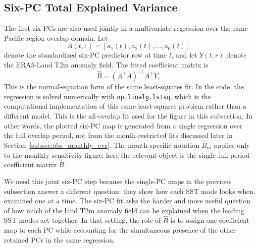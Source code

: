 \documentclass[11pt]{article}
\begin{document}
\subsection{Six-PC Total Explained Variance}
\label{subsec:obs_total_evr}

The first six PCs are also used jointly in a multivariate regression over the same Pacific-region
overlap domain. Let
\begin{equation}
A(t,:) = \left[a_1(t), a_2(t), \dots, a_6(t)\right]
\end{equation}
denote the standardized six-PC predictor row at time $t$, and let $Y(t,r)$ denote the ERA5-Land
T2m anomaly field. The fitted coefficient matrix is
\begin{equation}
\hat{B} = (A^\top A)^{-1} A^\top Y,
\label{eq:bhat_multi}
\end{equation}
This is the normal-equation form of the same least-squares fit. In the code, the regression is
solved numerically with \texttt{np.linalg.lstsq}, which is the computational implementation of this
same least-squares problem rather than a different model. This is the all-overlap fit used for the
figure in this subsection. In other words, the plotted six-PC map is generated from a single
regression over the full overlap period, not from the month-restricted fits discussed later in
Section~\ref{subsec:obs_monthly_evr}. The month-specific notation $\widehat{B}_m$ applies only to
the monthly sensitivity figure; here the relevant object is the single full-period coefficient
matrix $\widehat{B}$.

We need this joint six-PC step because the single-PC maps in the previous subsection answer a
different question: they show how each SST mode looks when examined one at a time. The six-PC fit
asks the harder and more useful question of how much of the land T2m anomaly field can be explained
when the leading SST modes act together. In that setting, the role of $\widehat{B}$ is to assign
one coefficient map to each PC while accounting for the simultaneous presence of the other retained
PCs in the same regression.
\end{document}
